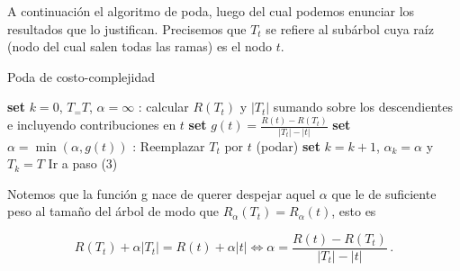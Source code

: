 A continuación el algoritmo de poda, luego del cual podemos enunciar los resultados que lo justifican. Precisemos que $T_t$ se refiere al subárbol cuya raíz (nodo del cual salen todas las ramas) es el nodo $t$.

\begin{algorithm}[H]
  \caption{Poda de costo-complejidad
    \label{alg:poda}}
  \begin{algorithmic}[1]
    \State\textbf{set} $k=0$, $T_= T$, $\alpha = \infty$
    :
        \State calcular $R(T_t)$ y $|T_t|$ sumando sobre los descendientes e incluyendo contribuciones en $t$
        \State \textbf{set} $g(t) = \frac{R(t) - R(T_t)}{|T_t| - |t|}$
        \State \textbf{set} $\alpha = \min(\alpha, g(t))$
    \EndFor
    :
            \State Reemplazar $T_t$ por $t$ (podar)
                \State \textbf{set} $k = k+1$, $\alpha_k = \alpha$ y $T_k = T$
                    \State{}
                \Else
                    \State Ir a paso (3)
                \EndIf
        \EndIf
    \EndFor
    \EndFunction
  \end{algorithmic}
\end{algorithm}

Notemos que la función g nace de querer despejar aquel $\alpha$ que le de suficiente peso al tamaño del árbol de modo que $R_\alpha (T_t) = R_\alpha(t)$, esto es

\begin{equation}
    R(T_t) + \alpha |T_t| = R(t) + \alpha |t| \Longleftrightarrow  \alpha = \frac{R(t) - R(T_t)}{|T_t| - |t|} \,.
\end{equation}

